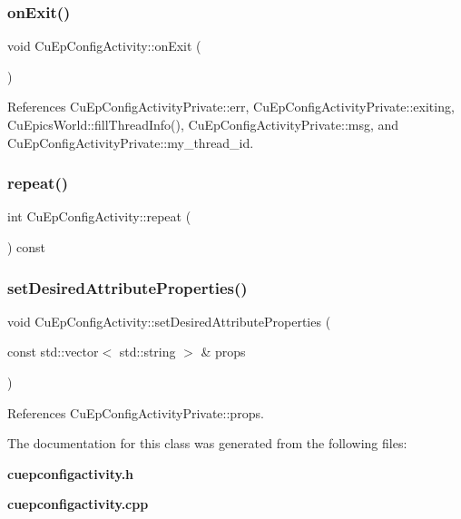 \mbox{\label{classCuEpConfigActivity_af9037bd055fdb74ee7ab29e37306b814}} 
\subsubsection{on\+Exit()}
{\footnotesize\ttfamily void Cu\+Ep\+Config\+Activity\+::on\+Exit (\begin{DoxyParamCaption}{ }\end{DoxyParamCaption})\hspace{0.3cm}{\ttfamily [protected]}}



References Cu\+Ep\+Config\+Activity\+Private\+::err, Cu\+Ep\+Config\+Activity\+Private\+::exiting, Cu\+Epics\+World\+::fill\+Thread\+Info(), Cu\+Ep\+Config\+Activity\+Private\+::msg, and Cu\+Ep\+Config\+Activity\+Private\+::my\+\_\+thread\+\_\+id.

\mbox{\label{classCuEpConfigActivity_afca293c4f124ca27f464f210b11b8ed4}} 
\subsubsection{repeat()}
{\footnotesize\ttfamily int Cu\+Ep\+Config\+Activity\+::repeat (\begin{DoxyParamCaption}{ }\end{DoxyParamCaption}) const}

\mbox{\label{classCuEpConfigActivity_aba4a5e72e609367f58b975a5df9f91c2}} 
\subsubsection{set\+Desired\+Attribute\+Properties()}
{\footnotesize\ttfamily void Cu\+Ep\+Config\+Activity\+::set\+Desired\+Attribute\+Properties (\begin{DoxyParamCaption}\item[{const std\+::vector$<$ std\+::string $>$ \&}]{props }\end{DoxyParamCaption})}



References Cu\+Ep\+Config\+Activity\+Private\+::props.



The documentation for this class was generated from the following files\+:\begin{DoxyCompactItemize}
\item 
\textbf{ cuepconfigactivity.\+h}\item 
\textbf{ cuepconfigactivity.\+cpp}\end{DoxyCompactItemize}
